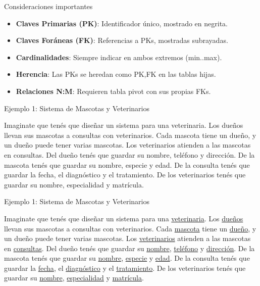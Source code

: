 \documentclass{beamer}
\begin{document}
\begin{frame}{Consideraciones importantes}
    \begin{itemize}
        \item<1-> \textbf{Claves Primarias (PK)}: Identificador único, mostrado en negrita.
        \item<2-> \textbf{Claves Foráneas (FK)}: Referencias a PKs, mostradas subrayadas.
        \item<3-> \textbf{Cardinalidades}: Siempre indicar en ambos extremos (min..max).
        \item<4-> \textbf{Herencia}: Las PKs se heredan como PK,FK en las tablas hijas.
        \item<5-> \textbf{Relaciones N:M}: Requieren tabla pivot con sus propias FKs.
    \end{itemize}
\end{frame}

\begin{frame}{Ejemplo 1: Sistema de Mascotas y Veterinarios}
    \begin{center}
        \small
        Imaginate que tenés que diseñar un sistema para una veterinaria. Los dueños llevan sus mascotas a consultas con veterinarios. Cada mascota tiene un dueño, y un dueño puede tener varias mascotas. Los veterinarios atienden a las mascotas en consultas. Del dueño tenés que guardar su nombre, teléfono y dirección. De la mascota tenés que guardar su nombre, especie y edad. De la consulta tenés que guardar la fecha, el diagnóstico y el tratamiento. De los veterinarios tenés que guardar su nombre, especialidad y matrícula.
    \end{center}
\end{frame}

\begin{frame}{Ejemplo 1: Sistema de Mascotas y Veterinarios}
    \begin{center}
        \small
        Imaginate que tenés que diseñar un sistema para una \ul{veterinaria}. Los \ul{dueños} llevan sus mascotas a consultas con veterinarios. Cada \ul{mascota} tiene un \ul{dueño}, y un dueño puede tener varias mascotas. Los \ul{veterinarios} atienden a las mascotas en \ul{consultas}. Del dueño tenés que guardar su \ul{nombre}, \ul{teléfono} y \ul{dirección}. De la mascota tenés que guardar su \ul{nombre}, \ul{especie} y \ul{edad}. De la consulta tenés que guardar la \ul{fecha}, el \ul{diagnóstico} y el \ul{tratamiento}. De los veterinarios tenés que guardar su \ul{nombre}, \ul{especialidad} y \ul{matrícula}.
    \end{center}
\end{frame}
\end{document}

